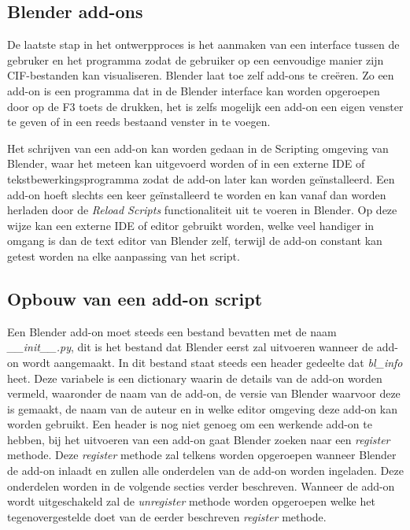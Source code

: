 \subsection{Blender add-ons}
De laatste stap in het ontwerpproces is het aanmaken van een interface tussen de gebruker en het programma zodat de gebruiker op een eenvoudige manier zijn CIF-bestanden kan visualiseren. Blender laat toe zelf add-ons te creëren. Zo een add-on is een programma dat in de Blender interface kan worden opgeroepen door op de F3 toets de drukken, het is zelfs mogelijk een add-on een eigen venster te geven of in een reeds bestaand venster in te voegen.
\par
Het schrijven van een add-on kan worden gedaan in de Scripting omgeving van Blender, waar het meteen kan uitgevoerd worden of in een externe IDE of tekstbewerkingsprogramma zodat de add-on later kan worden geïnstalleerd. Een add-on hoeft slechts een keer geïnstalleerd te worden en kan vanaf dan worden herladen door de \textit{Reload Scripts} functionaliteit uit te voeren in Blender. Op deze wijze kan een externe IDE of editor gebruikt worden, welke veel handiger in omgang is dan de text editor van Blender zelf, terwijl de add-on constant kan getest worden na elke aanpassing van het script.

\subsection{Opbouw van een add-on script}
Een Blender add-on moet steeds een bestand bevatten met de naam \textit{\_\_init\_\_.py}, dit is het bestand dat Blender eerst zal uitvoeren wanneer de add-on wordt aangemaakt. In dit bestand staat steeds een header gedeelte dat \textit{bl\_info} heet. Deze variabele is een dictionary waarin de details van de add-on worden vermeld, waaronder de naam van de add-on, de versie van Blender waarvoor deze is gemaakt, de naam van de auteur en in welke editor omgeving deze add-on kan worden gebruikt. Een header is nog niet genoeg om een werkende add-on te hebben, bij het uitvoeren van een add-on gaat Blender zoeken naar een \textit{register} methode. Deze \textit{register} methode zal telkens worden opgeroepen wanneer Blender de add-on inlaadt en zullen alle onderdelen van de add-on worden ingeladen. Deze onderdelen worden in de volgende secties verder beschreven. Wanneer de add-on wordt uitgeschakeld zal de \textit{unregister} methode worden opgeroepen welke het tegenovergestelde doet van de eerder beschreven \textit{register} methode.
\par
